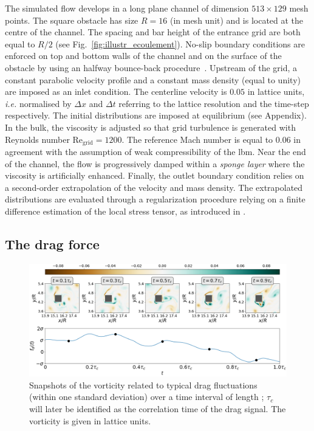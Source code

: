 \documentclass{jfm}
\newcommand{\EL}[1]{{\color{myred}{#1}}}
\begin{document}
% 
The simulated flow develops in a long plane channel of dimension $513 \times 129$ mesh points. The square obstacle has size $R=16$ (in mesh unit) and is located at the centre of the channel. The spacing and bar height of the entrance grid are both equal to $R/2$ (see Fig.~\ref{fig:illustr_ecoulement}).
% 
No-slip boundary conditions are enforced on top and bottom walls of the channel and on the surface of the obstacle by using an halfway bounce-back procedure~\citep{lbm_book}.
% 
Upstream of the grid, a constant parabolic velocity profile and a constant mass density (equal to unity) are imposed as an inlet condition.
The centerline velocity is $0.05$ in lattice units, \textit{i.e.} normalised by $\Delta x$ and $\Delta t$ referring to the lattice resolution and the time-step respectively. The initial distributions are imposed at equilibrium (see Appendix).
In the bulk, the viscosity is adjusted so that grid turbulence is generated with Reynolds number $\mathrm{Re_{grid}}=1200$. The reference Mach number is equal to $0.06$ in agreement with the assumption of weak compressibility of the \ac{lbm}.
Near the end of the channel, the flow is progressively damped within a \textit{sponge layer} where the viscosity is artificially enhanced.
Finally, the outlet boundary condition relies on a second-order extrapolation of the velocity and mass density.
The extrapolated distributions are evaluated through a regularization procedure relying on a finite difference estimation of the local stress tensor, as introduced in \cite{latt2008straight}.


\subsection{The drag force}
\label{sec:drag_force}

\begin{figure}
  \centering
  \includegraphics[width=\linewidth]{ecoulement_typique/ecoulement_typique.png}
  \caption{Snapshots of the vorticity related to typical drag fluctuations (within one standard deviation) over a time interval of length \EL{$\tau_c \simeq 4T_0$}; $\tau_c$ will later be identified as the correlation time of the drag signal.
    The vorticity is given in lattice units.}
  \label{fig:typical_vorticity}
\end{figure}
\end{document}
